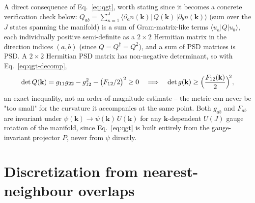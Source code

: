 \documentclass[11pt]{article}
\begin{document}
A direct consequence of Eq.~\eqref{eq:qgt}, worth stating since it becomes a concrete
verification check below: $Q_{ab} = \sum_{n=1}^J \langle\partial_a n(\mathbf k)|\,Q(\mathbf
k)\,|\partial_b n(\mathbf k)\rangle$ (sum over the $J$ states spanning the manifold) is a
sum of Gram-matrix-like terms $\langle u_a|Q|u_b\rangle$, each individually positive
semi-definite as a $2\times2$ Hermitian matrix in the direction indices $(a,b)$ (since
$Q=Q^\dagger=Q^2$), and a sum of PSD matrices is PSD. A $2\times2$ Hermitian PSD matrix has
non-negative determinant, so with Eq.~\eqref{eq:qgt-decomp},
\begin{equation}
  \det Q(\mathbf k) = g_{11}g_{22} - g_{12}^2 - \bigl(F_{12}/2\bigr)^2 \ge 0
  \quad\Longrightarrow\quad
  \det g(\mathbf k) \ge \Bigl(\frac{F_{12}(\mathbf k)}{2}\Bigr)^{\!2},
  \label{eq:qgt-psd-bound}
\end{equation}
an exact inequality, not an order-of-magnitude estimate -- the metric can never be "too
small" for the curvature it accompanies at the same point. Both $g_{ab}$ and $F_{ab}$ are invariant
under $\psi(\mathbf k)\to\psi(\mathbf k)\,U(\mathbf k)$ for any $\mathbf k$-dependent
$U(J)$ gauge rotation of the manifold, since Eq.~\eqref{eq:qgt} is built entirely from the
gauge-invariant projector $P$, never from $\psi$ directly.

\section{Discretization from nearest-neighbour overlaps}
\end{document}
